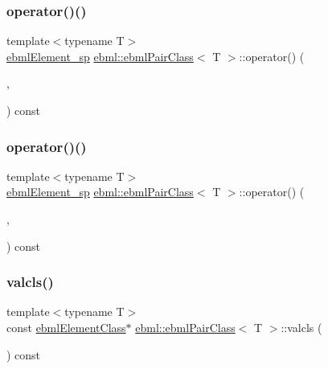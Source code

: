 \subsubsection{\texorpdfstring{operator()()}{operator()()}\hspace{0.1cm}{\footnotesize\ttfamily [4/5]}}
{\footnotesize\ttfamily template$<$typename T$>$ \\
\mbox{\hyperlink{namespaceebml_adad533b7705a16bb360fe56380c5e7be}{ebml\+Element\+\_\+sp}} \mbox{\hyperlink{classebml_1_1ebmlPairClass}{ebml\+::ebml\+Pair\+Class}}$<$ T $>$\+::operator() (\begin{DoxyParamCaption}\item[{const T \&}]{,  }\item[{\mbox{\hyperlink{namespaceebml_adad533b7705a16bb360fe56380c5e7be}{ebml\+Element\+\_\+sp}} \&\&}]{ }\end{DoxyParamCaption}) const}

\mbox{\label{classebml_1_1ebmlPairClass_abaeddeedcfdddb43a87175bf7f17dc31}} 
\subsubsection{\texorpdfstring{operator()()}{operator()()}\hspace{0.1cm}{\footnotesize\ttfamily [5/5]}}
{\footnotesize\ttfamily template$<$typename T$>$ \\
\mbox{\hyperlink{namespaceebml_adad533b7705a16bb360fe56380c5e7be}{ebml\+Element\+\_\+sp}} \mbox{\hyperlink{classebml_1_1ebmlPairClass}{ebml\+::ebml\+Pair\+Class}}$<$ T $>$\+::operator() (\begin{DoxyParamCaption}\item[{T \&\&}]{,  }\item[{\mbox{\hyperlink{namespaceebml_adad533b7705a16bb360fe56380c5e7be}{ebml\+Element\+\_\+sp}} \&\&}]{ }\end{DoxyParamCaption}) const}

\mbox{\label{classebml_1_1ebmlPairClass_ac4726d7f429838e8ec8e2d294b680a3d}} 
\subsubsection{\texorpdfstring{valcls()}{valcls()}}
{\footnotesize\ttfamily template$<$typename T$>$ \\
const \mbox{\hyperlink{classebml_1_1ebmlElementClass}{ebml\+Element\+Class}}$\ast$ \mbox{\hyperlink{classebml_1_1ebmlPairClass}{ebml\+::ebml\+Pair\+Class}}$<$ T $>$\+::valcls (\begin{DoxyParamCaption}{ }\end{DoxyParamCaption}) const}



